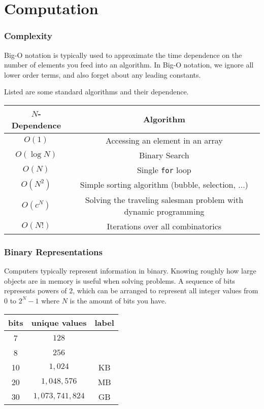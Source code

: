 \chapter{Computation}

\subsection{Complexity}

Big-O notation is typically used to approximate the time dependence on the number of elements you feed into an algorithm. In Big-O notation, we ignore all lower order terms, and also forget about any leading constants.

Listed are some standard algorithms and their dependence.

\begin{center}
\begin{tabular}{ | c | c|} 
\hline
 $N$-Dependence & Algorithm\\ \hline
$O(1)$ & Accessing an element in an array  \\ 
$O(\log N)$ & Binary Search  \\
$O(N)$ & Single \texttt{for} loop \\ 
$O(N^2)$ & Simple sorting algorithm (bubble, selection, ...)\\
$O(c^N)$ & Solving the traveling salesman problem with dynamic programming \\
$O(N!)$ & Iterations over all combinatorics \\
\hline
\end{tabular}
\end{center}

\subsection{Binary Representations}

Computers typically represent information in binary. Knowing roughly how large objects are in memory is useful when solving problems. A sequence of bits represents powers of 2, which can be arranged to represent all integer values from 0 to $2^N-1$ where $N$ is the amount of bits you have. 
\begin{center}
\begin{tabular}{ | c | c| c|} 
\hline
 bits & unique values & label \\ \hline
7 & $128$ &  \\ 
8 & $256$ &  \\ 
10 & $1,024$ & KB \\ 
20 & $1,048,576$ & MB \\ 
30 & $1,073,741,824$ & GB \\ 
\hline
\end{tabular}
\end{center}

